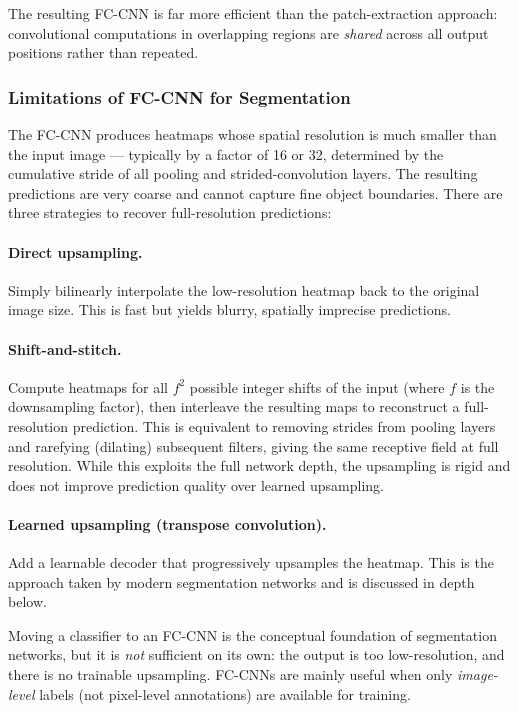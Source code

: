 \documentclass[11pt,a4paper]{article}
\begin{document}
The resulting FC-CNN is far more efficient than the patch-extraction approach: convolutional computations in overlapping regions are \emph{shared} across all output positions rather than repeated.

\subsubsection{Limitations of FC-CNN for Segmentation}

The FC-CNN produces heatmaps whose spatial resolution is much smaller than the input image — typically by a factor of 16 or 32, determined by the cumulative stride of all pooling and strided-convolution layers. The resulting predictions are very coarse and cannot capture fine object boundaries. There are three strategies to recover full-resolution predictions:

\paragraph{Direct upsampling.} Simply bilinearly interpolate the low-resolution heatmap back to the original image size. This is fast but yields blurry, spatially imprecise predictions.

\paragraph{Shift-and-stitch.} Compute heatmaps for all $f^2$ possible integer shifts of the input (where $f$ is the downsampling factor), then interleave the resulting maps to reconstruct a full-resolution prediction. This is equivalent to removing strides from pooling layers and rarefying (dilating) subsequent filters, giving the same receptive field at full resolution. While this exploits the full network depth, the upsampling is rigid and does not improve prediction quality over learned upsampling.

\paragraph{Learned upsampling (transpose convolution).} Add a learnable decoder that progressively upsamples the heatmap. This is the approach taken by modern segmentation networks and is discussed in depth below.

\begin{warnbox}
Moving a classifier to an FC-CNN is the conceptual foundation of segmentation networks, but it is \emph{not} sufficient on its own: the output is too low-resolution, and there is no trainable upsampling. FC-CNNs are mainly useful when only \emph{image-level} labels (not pixel-level annotations) are available for training.
\end{warnbox}
\end{document}
